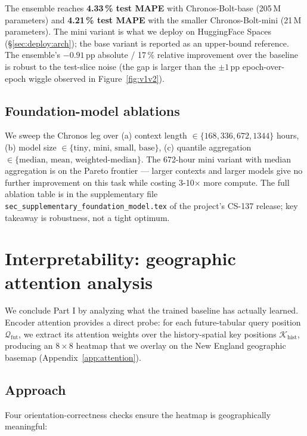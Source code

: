 The ensemble reaches \textbf{4.33\,\% test MAPE} with Chronos-Bolt-base (205\,M parameters) and \textbf{4.21\,\% test MAPE} with the smaller Chronos-Bolt-mini (21\,M parameters). The mini variant is what we deploy on HuggingFace Spaces (\S\ref{sec:deploy:arch}); the base variant is reported as an upper-bound reference. The ensemble's $-0.91$\,pp absolute / 17\,\% relative improvement over the baseline is robust to the test-slice noise (the gap is larger than the $\pm 1$\,pp epoch-over-epoch wiggle observed in Figure~\ref{fig:v1v2}).

\subsection{Foundation-model ablations}
\label{sec:ensemble:ablation}

We sweep the Chronos leg over (a) context length $\in \{168, 336, 672, 1344\}$ hours, (b) model size $\in \{\text{tiny, mini, small, base}\}$, (c) quantile aggregation $\in \{\text{median, mean, weighted-median}\}$. The 672-hour mini variant with median aggregation is on the Pareto frontier --- larger contexts and larger models give no further improvement on this task while costing 3-10$\times$ more compute. The full ablation table is in the supplementary file \texttt{sec\_supplementary\_foundation\_model.tex} of the project's CS-137 release; key takeaway is robustness, not a tight optimum.

\section{Interpretability: geographic attention analysis}
\label{sec:attn}

We conclude Part I by analyzing what the trained baseline has actually learned. Encoder attention provides a direct probe: for each future-tabular query position $\mathcal{Q}_{\text{fut}}$, we extract its attention weights over the history-spatial key positions $\mathcal{K}_{\text{hist}}$, producing an $8\times 8$ heatmap that we overlay on the New England geographic basemap (Appendix~\ref{app:attention}).

\subsection{Approach}

Four orientation-correctness checks ensure the heatmap is geographically meaningful:

